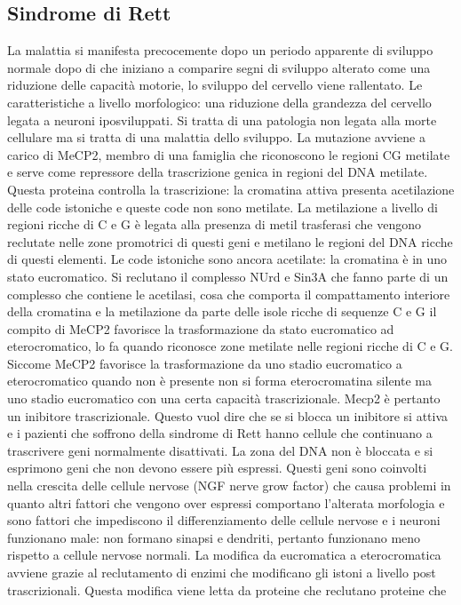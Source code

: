 \subsection{Sindrome di Rett}
La malattia si manifesta precocemente dopo un periodo apparente di sviluppo normale dopo di che iniziano a comparire segni di sviluppo alterato come una riduzione delle capacit\`a 
motorie, lo sviluppo del cervello viene rallentato. Le caratteristiche a livello morfologico: una riduzione della grandezza del cervello legata a neuroni iposviluppati. Si tratta di una
patologia non legata alla morte cellulare ma si tratta di una malattia dello sviluppo. La mutazione avviene a carico di MeCP2, membro di una famiglia che riconoscono le regioni CG 
metilate e serve come repressore della trascrizione genica in regioni del DNA metilate. Questa proteina controlla la trascrizione: la cromatina attiva presenta acetilazione delle code
istoniche e queste code non sono metilate. La metilazione a livello di regioni ricche di C e G \`e legata alla presenza di metil trasferasi che vengono reclutate nelle zone promotrici
di questi geni e metilano le regioni del DNA ricche di questi elementi. Le code istoniche sono ancora acetilate: la cromatina \`e in uno stato eucromatico. Si reclutano il complesso NUrd 
e Sin3A che fanno parte di un complesso che contiene le acetilasi, cosa che comporta il compattamento interiore della cromatina e la metilazione da parte delle isole ricche di sequenze 
C e G il compito di MeCP2 favorisce la trasformazione da stato eucromatico ad eterocromatico, lo fa quando riconosce zone metilate nelle regioni ricche di C e G. Siccome MeCP2 favorisce 
la trasformazione da uno stadio eucromatico a eterocromatico quando non \`e presente non si forma eterocromatina silente ma uno stadio eucromatico con una certa capacit\`a trascrizionale.
Mecp2 \`e pertanto un inibitore trascrizionale. Questo vuol dire che se si blocca un inibitore si attiva e i pazienti che soffrono della sindrome di Rett hanno cellule che continuano a
trascrivere geni normalmente disattivati. La zona del DNA non \`e bloccata e si esprimono geni che non devono essere pi\`u espressi. Questi geni sono coinvolti nella crescita delle 
cellule nervose (NGF nerve grow factor) che causa problemi in quanto altri fattori che vengono over espressi comportano l'alterata morfologia e sono fattori che impediscono il 
differenziamento delle cellule nervose e i neuroni funzionano male: non formano sinapsi e dendriti, pertanto funzionano meno rispetto a cellule nervose normali. La modifica da eucromatica
a eterocromatica avviene grazie al reclutamento di enzimi che modificano gli istoni a livello post trascrizionali. Questa modifica viene letta da proteine che reclutano proteine che
